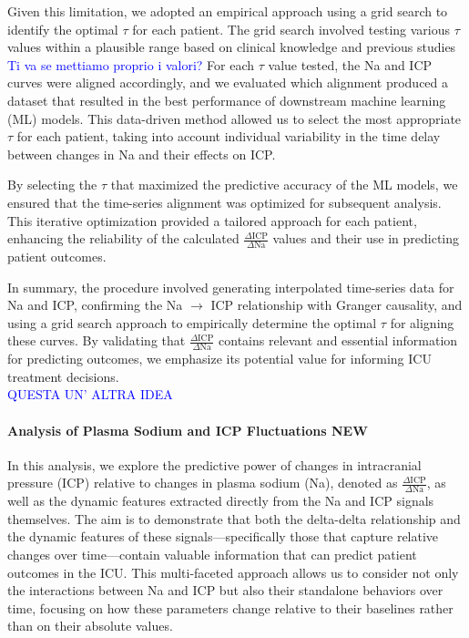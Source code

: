 Given this limitation, we adopted an empirical approach using a grid search to identify the optimal $\tau$ for each patient. The grid search involved testing various $\tau$ values within a plausible range based on clinical knowledge and previous studies \textcolor{blue}{Ti va se mettiamo proprio i valori?} For each $\tau$ value tested, the Na and ICP curves were aligned accordingly, and we evaluated which alignment produced a dataset that resulted in the best performance of downstream machine learning (ML) models. This data-driven method allowed us to select the most appropriate $\tau$ for each patient, taking into account individual variability in the time delay between changes in Na and their effects on ICP.

By selecting the $\tau$ that maximized the predictive accuracy of the ML models, we ensured that the time-series alignment was optimized for subsequent analysis. This iterative optimization provided a tailored approach for each patient, enhancing the reliability of the calculated \(\frac{\Delta \text{ICP}}{\Delta \text{Na}}\) values and their use in predicting patient outcomes.

In summary, the procedure involved generating interpolated time-series data for Na and ICP, confirming the Na $\rightarrow$ ICP relationship with Granger causality, and using a grid search approach to empirically determine the optimal $\tau$ for aligning these curves. By validating that \(\frac{\Delta \text{ICP}}{\Delta \text{Na}}\) contains relevant and essential information for predicting outcomes, we emphasize its potential value for informing ICU treatment decisions.
\\
\textcolor{blue}{QUESTA UN' ALTRA IDEA}
\paragraph{Analysis of Plasma Sodium and ICP Fluctuations NEW}

In this analysis, we explore the predictive power of changes in intracranial pressure (ICP) relative to changes in plasma sodium (Na), denoted as $\frac{\Delta \text{ICP}}{\Delta \text{Na}}$, as well as the dynamic features extracted directly from the Na and ICP signals themselves. The aim is to demonstrate that both the delta-delta relationship and the dynamic features of these signals—specifically those that capture relative changes over time—contain valuable information that can predict patient outcomes in the ICU. This multi-faceted approach allows us to consider not only the interactions between Na and ICP but also their standalone behaviors over time, focusing on how these parameters change relative to their baselines rather than on their absolute values.

